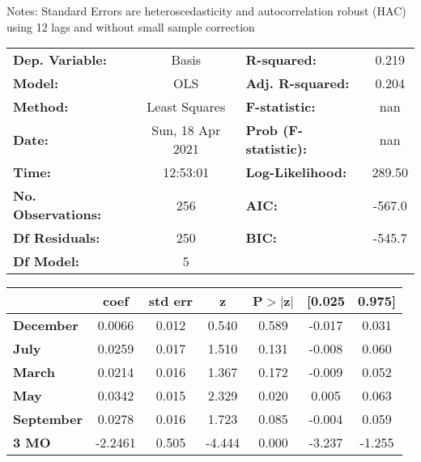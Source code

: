 Notes: \newline
 [1] Standard Errors are heteroscedasticity and autocorrelation robust (HAC) using 12 lags and without small sample correction
\begin{center}
\begin{tabular}{lclc}
\toprule
\textbf{Dep. Variable:}    &      Basis       & \textbf{  R-squared:         } &     0.219   \\
\textbf{Model:}            &       OLS        & \textbf{  Adj. R-squared:    } &     0.204   \\
\textbf{Method:}           &  Least Squares   & \textbf{  F-statistic:       } &       nan   \\
\textbf{Date:}             & Sun, 18 Apr 2021 & \textbf{  Prob (F-statistic):} &      nan    \\
\textbf{Time:}             &     12:53:01     & \textbf{  Log-Likelihood:    } &    289.50   \\
\textbf{No. Observations:} &         256      & \textbf{  AIC:               } &    -567.0   \\
\textbf{Df Residuals:}     &         250      & \textbf{  BIC:               } &    -545.7   \\
\textbf{Df Model:}         &           5      & \textbf{                     } &             \\
\bottomrule
\end{tabular}
\begin{tabular}{lcccccc}
                   & \textbf{coef} & \textbf{std err} & \textbf{z} & \textbf{P$> |$z$|$} & \textbf{[0.025} & \textbf{0.975]}  \\
\midrule
\textbf{December}  &       0.0066  &        0.012     &     0.540  &         0.589        &       -0.017    &        0.031     \\
\textbf{July}      &       0.0259  &        0.017     &     1.510  &         0.131        &       -0.008    &        0.060     \\
\textbf{March}     &       0.0214  &        0.016     &     1.367  &         0.172        &       -0.009    &        0.052     \\
\textbf{May}       &       0.0342  &        0.015     &     2.329  &         0.020        &        0.005    &        0.063     \\
\textbf{September} &       0.0278  &        0.016     &     1.723  &         0.085        &       -0.004    &        0.059     \\
\textbf{3 MO}      &      -2.2461  &        0.505     &    -4.444  &         0.000        &       -3.237    &       -1.255     \\

\end{tabular}
\end{center}
